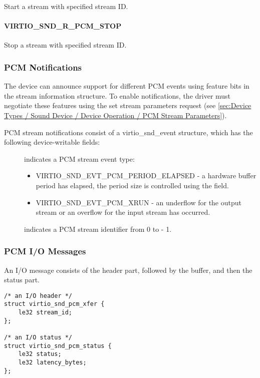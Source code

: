 Start a stream with specified stream ID.

\paragraph{VIRTIO_SND_R_PCM_STOP}

Stop a stream with specified stream ID.

\subsubsection{PCM Notifications}

The device can announce support for different PCM events using feature bits
in the stream information structure. To enable notifications, the driver
must negotiate these features using the set stream parameters request
(see \ref{sec:Device Types / Sound Device / Device Operation / PCM Stream Parameters}).

PCM stream notifications consist of a virtio_snd_event structure, which has the
following device-writable fields:

\begin{description}
\item[] indicates a PCM stream event type:
\begin{itemize}
\item VIRTIO_SND_EVT_PCM_PERIOD_ELAPSED - a hardware buffer period has elapsed,
the period size is controlled using the  field.
\item VIRTIO_SND_EVT_PCM_XRUN - an underflow for the output stream or an overflow
for the input stream has occurred.
\end{itemize}
\item[] indicates a PCM stream identifier from 0 to  - 1.
\end{description}

\subsubsection{PCM I/O Messages}\label{sec:Device Types / Sound Device / Device Operation / PCM IO Messages}

An I/O message consists of the header part, followed by the buffer, and then
the status part.

\begin{lstlisting}
/* an I/O header */
struct virtio_snd_pcm_xfer {
    le32 stream_id;
};

/* an I/O status */
struct virtio_snd_pcm_status {
    le32 status;
    le32 latency_bytes;
};
\end{lstlisting}

